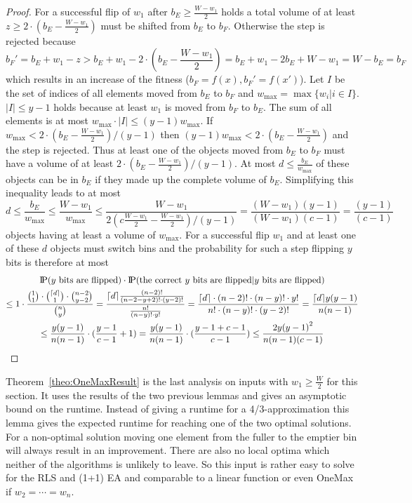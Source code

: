\begin{proof}
    For a successful flip of $w_1$ after $b_E \ge \frac{W-w_1}{2}$ holds a total volume of at least $z\ge2\cdot(b_E-\frac{W-w_1}{2})$ must be shifted from $b_E$ to $b_F$.
    Otherwise the step is rejected because
    \[b_F'=b_E+w_1-z>b_E+w_1-2\cdot(b_E-\frac{W-w_1}{2})=b_E+w_1-2b_E+W-w_1=W-b_E=b_F\]
    which results in an increase of the fitness ($b_F = f(x), b_F' = f(x')$).
    Let $I$ be the set of indices of all elements moved from $b_E$ to $b_F$ and $w_{\max}=\max{\{w_i|i\in I\}}$.
    $|I|\le y-1$ holds because at least $w_1$ is moved from $b_F$ to $b_E$.
    The sum of all elements is at most $w_{\max} \cdot |I| \le (y-1)w_{\max}$.
    If \(w_{\max}<2\cdot(b_E-\frac{W-w_1}{2})/(y-1)\) then \((y-1)w_{\max}<2\cdot(b_E-\frac{W-w_1}{2})\) and the step is rejected.
    Thus at least one of the objects moved from $b_E$ to $b_F$ must have a volume of at least $2\cdot(b_E-\frac{W-w_1}{2})/(y-1)$.
    At most \(d\le\frac{b_E}{w_{\max}}\) of these objects can be in $b_E$ if they made up the complete volume of $b_E$. Simplifying this inequality leads to at most
    \[
        d \le \frac{b_E}{w_{\max}}
        \le \frac{W-w_1}{w_{\max}}
        \le \frac{W-w_1}{2(c\frac{W-w_1}{2}-\frac{W-w_1}{2})/(y-1)}
        = \frac{(W-w_1)(y-1)}{(W-w_1)(c-1)}
        = \frac{(y-1)}{(c-1)}
    \]
    objects having at least a volume of $w_{\max}$.
    For a successful flip $w_1$ and at least one of these $d$ objects must switch bins and the probability for such a step flipping $y$ bits is therefore at most
    \begin{gather}
        \nonumber \text{I\kern-0.15em P}(y \text{ bits are flipped})\cdot\text{I\kern-0.15em P}(\text{the correct $y$ bits are flipped} | y \text{ bits are flipped})\\ \nonumber
        \le 1\cdot \frac{\binom{1}{1}\cdot\binom{\lceil d\rceil}{1}\cdot\binom{n-2}{y-2}}{\binom{n}{y}}
        =\frac{\lceil d\rceil\frac{(n-2)!}{(n-2-y+2)!\cdot (y-2)!}}{\frac{n!}{(n-y)!\cdot y!}}
        =\frac{\lceil d\rceil\cdot(n-2)!\cdot(n-y)!\cdot y!}{n!\cdot(n-y)!\cdot(y-2)!}
        = \frac{\lceil d\rceil y{(y-1)}}{n(n-1)}\\ \nonumber
        \le \frac{y{(y-1)}}{n(n-1)}\cdot(\frac{y-1}{c-1}+1)
        = \frac{y{(y-1)}}{n(n-1)}\cdot(\frac{y-1+c-1}{c-1})
        \le \frac{2y{(y-1)}^2}{n(n-1)(c-1)}
    \end{gather}
\end{proof}

Theorem~\ref{theo:OneMaxResult} is the last analysis on inputs with $w_1 \ge \frac W 2$ for this section.
It uses the results of the two previous lemmas and gives an asymptotic bound on the runtime.
Instead of giving a runtime for a 4/3-approximation this lemma gives the expected runtime for reaching one of the two optimal solutions.
For a non-optimal solution moving one element from the fuller to the emptier bin will always result in an improvement.
There are also no local optima which neither of the algorithms is unlikely to leave.
So this input is rather easy to solve for the RLS and (1+1) EA and comparable to a linear function or even OneMax if $w_2=\cdots=w_n$.

